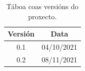 \documentclass[11pt,a4paper,titlepage,twoside,openright,openbib]{report}
\begin{document}

 
 \setcounter{page}{1}

\begin{table}[h!]
\centering
\begin{tabular}{||c | c||} 
 \hline
 \textbf{Versión} & \textbf{Data}\\ [0.5ex] 
 \hline\hline
 0.1 & 04/10/2021\\
  [1ex] 
 \hline
 0.2 & 08/11/2021\\
  [1ex] 
 \hline
\end{tabular}
\caption{Táboa coas versións do proxecto.}
\label{table:1}
\end{table}

\let\cleardoublepage=\clearpage 

 \tableofcontents

\vspace{30pt}


 
 

 \setcounter{page}{1}
 
  
 
 
  \let\cleardoublepage=\clearpage 
 
  \let\cleardoublepage=\clearpage 




%


 
 
  \let\cleardoublepage=\clearpage 
 
\end{document}
